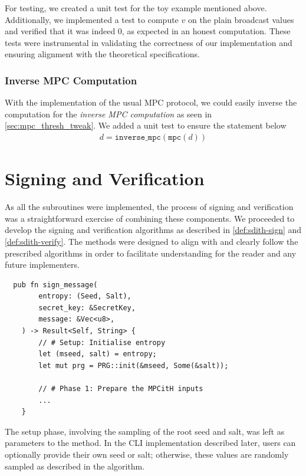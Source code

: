 \documentclass[11pt]{report}
\theoremstyle{definition}
\theoremstyle{plain}
\begin{document}
For testing, we created a unit test for the toy example mentioned above. Additionally, we implemented a test to compute $v$ on the plain broadcast values and verified that it was indeed $0$, as expected in an honest computation. These tests were instrumental in validating the correctness of our implementation and ensuring alignment with the theoretical specifications.

\subsubsection{Inverse MPC Computation}

With the implementation of the usual MPC protocol, we could easily inverse the computation for the \textit{inverse MPC computation} as seen in \autoref{sec:mpc_thresh_tweak}. We added a unit test to ensure the statement below
\begin{align*}
  d = \texttt{inverse\_mpc}(\texttt{mpc}(d))
\end{align*}

\section{Signing and Verification}\label{sub:signing_verification}
As all the subroutines were implemented, the process of signing and verification was a straightforward exercise of combining these components. We proceeded to develop the signing and verification algorithms as described in \autoref{def:sdith-sign} and \autoref{def:sdith-verify}. The methods were designed to align with and clearly follow the prescribed algorithms in order to facilitate understanding for the reader and any future implementers.

\begin{verbatim}
  pub fn sign_message(
        entropy: (Seed, Salt),
        secret_key: &SecretKey,
        message: &Vec<u8>,
    ) -> Result<Self, String> {
        // # Setup: Initialise entropy
        let (mseed, salt) = entropy;
        let mut prg = PRG::init(&mseed, Some(&salt));

        // # Phase 1: Prepare the MPCitH inputs
        ...
    }
\end{verbatim}

The setup phase, involving the sampling of the root seed and salt, was left as parameters to the method. In the CLI implementation described later, users can optionally provide their own seed or salt; otherwise, these values are randomly sampled as described in the algorithm.
\end{document}
